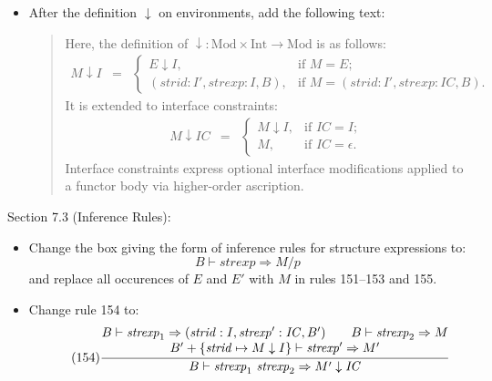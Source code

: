 \documentclass[twoside,titlepage]{article}
\begin{document}
\begin{appendix}
\begin{itemize}
\item After the definition $\downarrow$ on environments, add the following text:
  \begin{quote}
  Here, the definition of $\downarrow: \mbox{Mod} \times \mbox{Int} \to \mbox{Mod}$ is as follows:
  \begin{eqnarray*}
  M\downarrow I &=& \left\{
    \begin{array}{ll}
    E \downarrow I, & \textrm{if $M = E$;} \\
    (\mathit{strid}:I', \mathit{strexp}:I, B), & \textrm{if $M = (\mathit{strid}:I', \mathit{strexp}:\mathit{IC}, B)$.}
    \end{array} \right.
  \end{eqnarray*}
  It is extended to interface constraints:
  \begin{eqnarray*}
  M\downarrow \mathit{IC} &=& \left\{
    \begin{array}{ll}
    M \downarrow I, & \textrm{if $\mathit{IC} = I$;} \\
    M, & \textrm{if $\mathit{IC} = \epsilon$.}
    \end{array} \right.
  \end{eqnarray*}
  Interface constraints express optional interface modifications applied to a functor body via higher-order ascription.
  \end{quote}
\end{itemize}

Section 7.3 (Inference Rules):
\begin{itemize}
\item Change the box giving the form of inference rules for structure expressions to:
  $$
  \boxed{B \vdash \mathit{strexp} \Rightarrow M/p}
  $$
  and replace all occurences of $E$ and $E'$ with $M$ in rules 151--153 and 155.

\item Change rule 154 to:
  \begin{equation}
  \tag{154}
  \frac{
  \begin{array}{@{}c@{}}
  B \vdash \mathit{strexp}_1 \Rightarrow (\mathit{strid}:I, \mathit{strexp}':\mathit{IC}, B')
  \qquad
  B \vdash \mathit{strexp}_2 \Rightarrow M
  \\
  B'+\{\mathit{strid}\mapsto M\downarrow I\} \vdash \mathit{strexp}' \Rightarrow M'
  \end{array}
  }{
  B \vdash \mathit{strexp}_1~\mathit{strexp}_2 \Rightarrow M' \downarrow \mathit{IC}
  }
  \end{equation}


\end{itemize}
\end{appendix}
\end{document}
